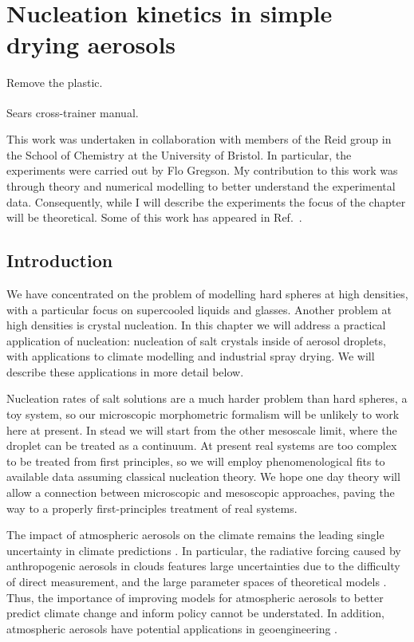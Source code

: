 \documentclass[11pt,twoside]{report}
\begin{document}
\chapter{Nucleation kinetics in simple drying aerosols}
\epigraph{Remove the plastic.}{Sears\textsuperscript{\textregistered} cross-trainer manual.}
\label{chapter:aerosols}

This work was undertaken in collaboration with members of the Reid group in the School of Chemistry at the University of Bristol.
In particular, the experiments were carried out by Flo Gregson.
My contribution to this work was through theory and numerical modelling to better understand the experimental data.
Consequently, while I will describe the experiments the focus of the chapter will be theoretical.
Some of this work has appeared in Ref.\ \cite{GregsonJPCB2019}.

\section{Introduction}

We have concentrated on the problem of modelling hard spheres at high densities, with a particular focus on supercooled liquids and glasses.
Another problem at high densities is crystal nucleation.
In this chapter we will address a practical application of nucleation: nucleation of salt crystals inside of aerosol droplets, with applications to climate modelling and industrial spray drying.
We will describe these applications in more detail below.

Nucleation rates of salt solutions are a much harder problem than hard spheres, a toy system, so our microscopic morphometric formalism will be unlikely to work here at present.
In stead we will start from the other mesoscale limit, where the droplet can be treated as a continuum.
At present real systems are too complex to be treated from first principles, so we will employ phenomenological fits to available data assuming classical nucleation theory.
We hope one day theory will allow a connection between microscopic and mesoscopic approaches, paving the way to a properly first-principles treatment of real systems.

The impact of atmospheric aerosols on the climate remains the leading single uncertainty in climate predictions \cite{BoucherIPCC2013,CarslawN2013,LeePNAS2016,RegayreACP2018}.
In particular, the radiative forcing caused by anthropogenic aerosols in clouds features large uncertainties due to the difficulty of direct measurement, and the large parameter spaces of theoretical models \cite{LeePNAS2016}.
Thus, the importance of improving models for atmospheric aerosols to better predict climate change and inform policy cannot be understated.
In addition, atmospheric aerosols have potential applications in geoengineering \cite{PringleACP2012}.
\end{document}
